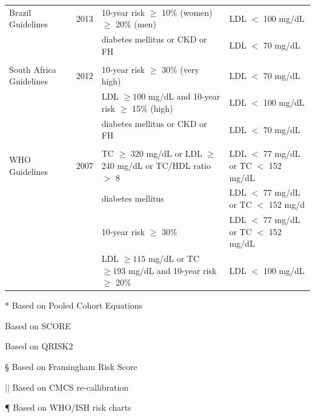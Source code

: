 \documentclass[12pt]{article}
\begin{document}
\begin{appendix}
\begin{landscape}
\begin{table}[H]
{\begin{threeparttable}
\begin{tabular}{llll}
            Brazil Guidelines \cite{anderson_2012_2013} & 2013 & 10-year risk\tnote{\S} \hspace{1pt} $\geq$ 10\% (women) $\geq$ 20\% (men) & LDL $<$ 100 mg/dL \\
            & & diabetes mellitus or CKD or FH & LDL $<$ 70 mg/dL \\
            & & & \\
            South Africa Guidelines \cite{anderson_2012_2013} & 2012 & 10-year risk\tnote{\S} \hspace{1pt} $\geq$ 30\% (very high) & LDL $<$ 70 mg/dL \\
            & & LDL $\geq 100$ mg/dL and 10-year risk\tnote{\S} \hspace{1pt}  $\geq$ 15\% (high) & LDL $<$ 100 mg/dL \\
            & & diabetes mellitus or CKD or FH & LDL $<$ 70 mg/dL \\
            & & & \\
            WHO Guidelines \cite{anderson_2012_2013} & 2007 & TC $\geq$ 320 mg/dL or LDL $\geq$ 240 mg/dL or TC/HDL ratio $>$ 8 & LDL $<$ 77 mg/dL or TC $<$ 152 mg/dL \\
            & & diabetes mellitus & LDL $<$ 77 mg/dL or TC $<$ 152 mg/d  \\
            & & 10-year risk\tnote{\P} \hspace{1pt} $\geq$ 30\% & LDL $<$ 77 mg/dL or TC $<$ 152 mg/dL \\
            & & LDL $\geq 115$ mg/dL or TC $\geq 193$ mg/dL and 10-year risk\tnote{\P} \hspace{1pt}  $\geq$ 20\% & LDL $<$ 100 mg/dL \\
            \bottomrule
        \end{tabular}
        \begin{tablenotes}
            \item[*] Based on Pooled Cohort Equations
            \item[\textdagger] Based on SCORE
            \item[\ddag] Based on QRISK2
            \item[\S] Based on Framingham Risk Score
            \item[$||$] Based on CMCS re-callibration
            \item[\P] Based on WHO/ISH risk charts
        \end{tablenotes}
        \end{threeparttable}
        }
        \label{tab:guidelines}
    \end{table}


\end{landscape}
\end{appendix}
\end{document}
